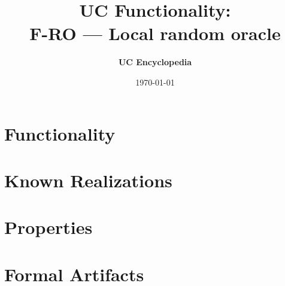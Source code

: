 \documentclass[11pt,a4paper]{article}
\title{\textbf{\Large UC Functionality:}\\[0.2em] \Large F-RO --- Local random oracle}
\author{\textbf{UC Encyclopedia}}
\date{\today}
\newtheorem{functionality}{Functionality}
\begin{document}
\maketitle

\begin{abstract}
\end{abstract}

\section{Functionality}

%

\section{Known Realizations}


\section{Properties}


\section{Formal Artifacts}

\end{document}
